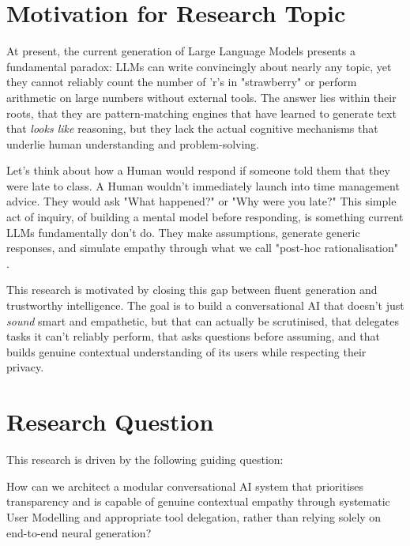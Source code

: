 \documentclass[a4paper,oneside,12pt]{book}
\numberwithin{equation}{chapter} %
\begin{document}
\section{Motivation for Research Topic}


At present, the current generation of Large Language Models presents a fundamental paradox: LLMs can write convincingly about nearly any topic, yet they cannot reliably count the number of 'r's in "strawberry" \cite{xu2025llmgeniusparadoxlinguistic} or perform arithmetic on large numbers without external tools. The answer lies within their roots, that they are pattern-matching engines that have learned to generate text that \textit{looks like} reasoning, but they lack the actual cognitive mechanisms that underlie human understanding and problem-solving.

Let's think about how a Human would respond if someone told them that they were late to class. A Human wouldn't immediately launch into time management advice. They would ask "What happened?" or "Why were you late?" This simple act of inquiry, of building a mental model before responding, is something current LLMs fundamentally don't do. They make assumptions, generate generic responses, and simulate empathy through what we call "post-hoc rationalisation" \cite{lewislim2025analysingchainthoughtdynamics}.

This research is motivated by closing this gap between fluent generation and trustworthy intelligence. The goal is to build a conversational AI that doesn't just \textit{sound} smart and empathetic, but that can actually be scrutinised, that delegates tasks it can't reliably perform, that asks questions before assuming, and that builds genuine contextual understanding of its users while respecting their privacy.

\section{Research Question}
This research is driven by the following guiding question:

How can we architect a modular conversational AI system that prioritises transparency and is capable of genuine contextual empathy through systematic User Modelling and appropriate tool delegation, rather than relying solely on end-to-end neural generation?
\end{document}
